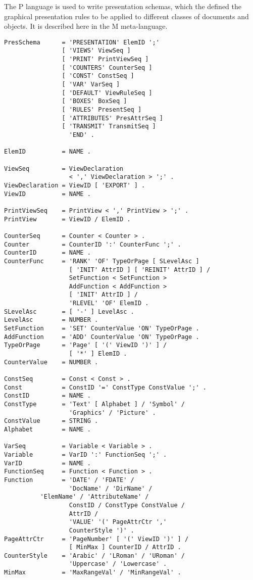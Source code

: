 The P language is used to write presentation schemas, which the
defined the graphical presentation rules to be applied to different
classes of documents and objects.  It is described here in the M
meta-language.
\begin{verbatim}
PresSchema      = 'PRESENTATION' ElemID ';'
                [ 'VIEWS' ViewSeq ]
                [ 'PRINT' PrintViewSeq ]
                [ 'COUNTERS' CounterSeq ]
                [ 'CONST' ConstSeq ]
                [ 'VAR' VarSeq ]
                [ 'DEFAULT' ViewRuleSeq ]
                [ 'BOXES' BoxSeq ]
                [ 'RULES' PresentSeq ]
                [ 'ATTRIBUTES' PresAttrSeq ]
                [ 'TRANSMIT' TransmitSeq ]
                  'END' .

ElemID          = NAME .

ViewSeq         = ViewDeclaration
                  < ',' ViewDeclaration > ';' .
ViewDeclaration = ViewID [ 'EXPORT' ] .
ViewID          = NAME .

PrintViewSeq    = PrintView < ',' PrintView > ';' .
PrintView       = ViewID / ElemID .

CounterSeq      = Counter < Counter > .
Counter         = CounterID ':' CounterFunc ';' .
CounterID       = NAME .
CounterFunc     = 'RANK' 'OF' TypeOrPage [ SLevelAsc ]
                  [ 'INIT' AttrID ] [ 'REINIT' AttrID ] /
                  SetFunction < SetFunction >
                  AddFunction < AddFunction >
                  [ 'INIT' AttrID ] /
                  'RLEVEL' 'OF' ElemID .
SLevelAsc       = [ '-' ] LevelAsc .
LevelAsc        = NUMBER .
SetFunction     = 'SET' CounterValue 'ON' TypeOrPage .
AddFunction     = 'ADD' CounterValue 'ON' TypeOrPage .
TypeOrPage      = 'Page' [ '(' ViewID ')' ] /
                  [ '*' ] ElemID .
CounterValue    = NUMBER .

ConstSeq        = Const < Const > .
Const           = ConstID '=' ConstType ConstValue ';' .
ConstID         = NAME .
ConstType       = 'Text' [ Alphabet ] / 'Symbol' /
                  'Graphics' / 'Picture' .
ConstValue      = STRING .
Alphabet        = NAME .

VarSeq          = Variable < Variable > .
Variable        = VarID ':' FunctionSeq ';' .
VarID           = NAME .
FunctionSeq     = Function < Function > .
Function        = 'DATE' / 'FDATE' /
                  'DocName' / 'DirName' /
		  'ElemName' / 'AttributeName' /
                  ConstID / ConstType ConstValue /
                  AttrID /
                  'VALUE' '(' PageAttrCtr ','
                  CounterStyle ')' .
PageAttrCtr     = 'PageNumber' [ '(' ViewID ')' ] /
                  [ MinMax ] CounterID / AttrID .
CounterStyle    = 'Arabic' / 'LRoman' / 'URoman' /
                  'Uppercase' / 'Lowercase' .
MinMax          = 'MaxRangeVal' / 'MinRangeVal' .


\end{verbatim}
